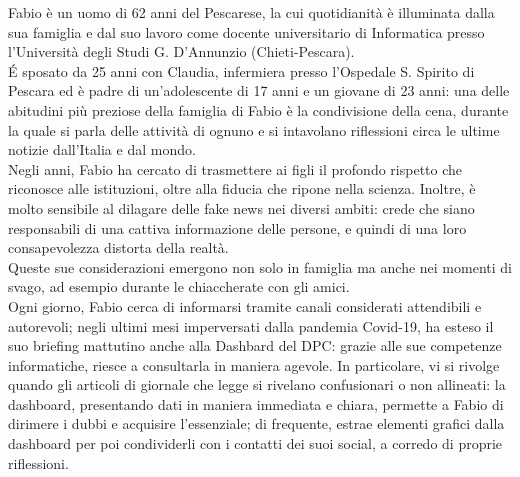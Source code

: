 Fabio è un uomo di 62 anni del Pescarese, la cui quotidianità è illuminata dalla sua famiglia e dal suo lavoro come docente universitario di Informatica presso l'Università degli Studi G. D'Annunzio (Chieti-Pescara).\\ 
É sposato da 25 anni con Claudia, infermiera presso l'Ospedale S. Spirito di Pescara ed è padre di un'adolescente di 17 anni e un giovane di 23 anni: una delle abitudini più preziose della famiglia di Fabio è la condivisione della cena, durante la quale si parla delle attività di ognuno e si intavolano riflessioni circa le ultime notizie dall'Italia e dal mondo.\\
Negli anni, Fabio ha cercato di trasmettere ai figli il profondo rispetto che riconosce alle istituzioni, oltre alla fiducia che ripone nella scienza. Inoltre, è molto sensibile al dilagare delle fake news nei diversi ambiti: crede che siano responsabili di una cattiva informazione delle persone, e quindi di una loro consapevolezza distorta della realtà.\\ 
Queste sue considerazioni emergono non solo in famiglia ma anche nei momenti di svago, ad esempio durante le chiaccherate con gli amici.\\ 
Ogni giorno, Fabio cerca di informarsi tramite canali considerati attendibili e autorevoli; negli ultimi mesi imperversati dalla pandemia Covid-19, ha esteso il suo briefing mattutino anche alla Dashbard del DPC: grazie alle sue competenze informatiche, riesce a consultarla in maniera agevole. In particolare, vi si rivolge quando gli articoli di giornale che legge si rivelano confusionari o non allineati: la dashboard, presentando dati in maniera immediata e chiara, permette a Fabio di dirimere i dubbi e acquisire l'essenziale; di frequente, estrae elementi grafici dalla dashboard per poi condividerli con i contatti dei suoi social, a corredo di proprie riflessioni.

